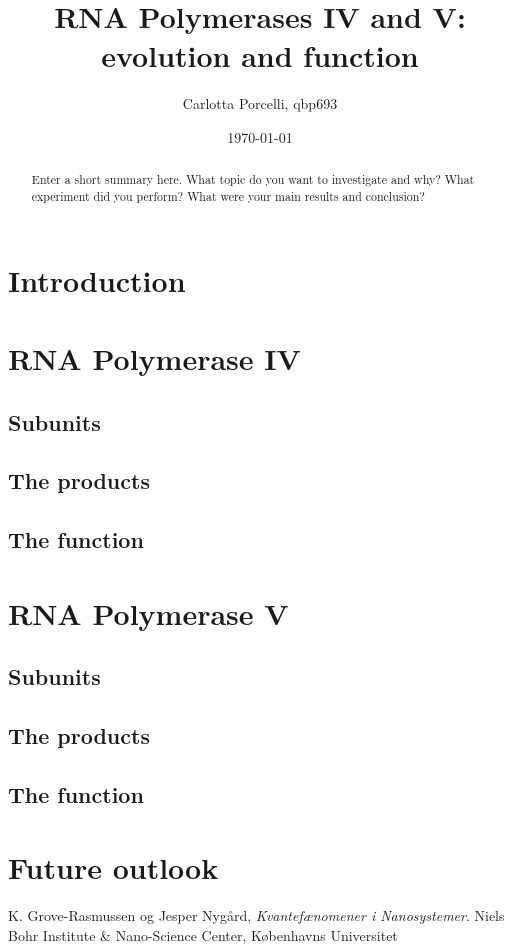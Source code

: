 \documentclass[a4paper, twocolumn]{article}
\title{RNA Polymerases IV and V: evolution and function}
\author{Carlotta Porcelli, qbp693}
\date{\today}
\begin{document}
\maketitle

\begin{abstract}
Enter a short summary here. What topic do you want to investigate and why? What experiment did you perform? What were your main results and conclusion?
\end{abstract}

\section{Introduction}



\section{RNA Polymerase IV}

\subsection{Subunits}

\subsection{The products}

\subsection{The function}

\section{RNA Polymerase V}

\subsection{Subunits}

\subsection{The products}

\subsection{The function}

\section{Future outlook}


\begin{thebibliography}{9}
  K. Grove-Rasmussen og Jesper Nygård,
  \emph{Kvantefænomener i Nanosystemer}.
  Niels Bohr Institute \& Nano-Science Center, Københavns Universitet

\end{thebibliography}
\end{document}
